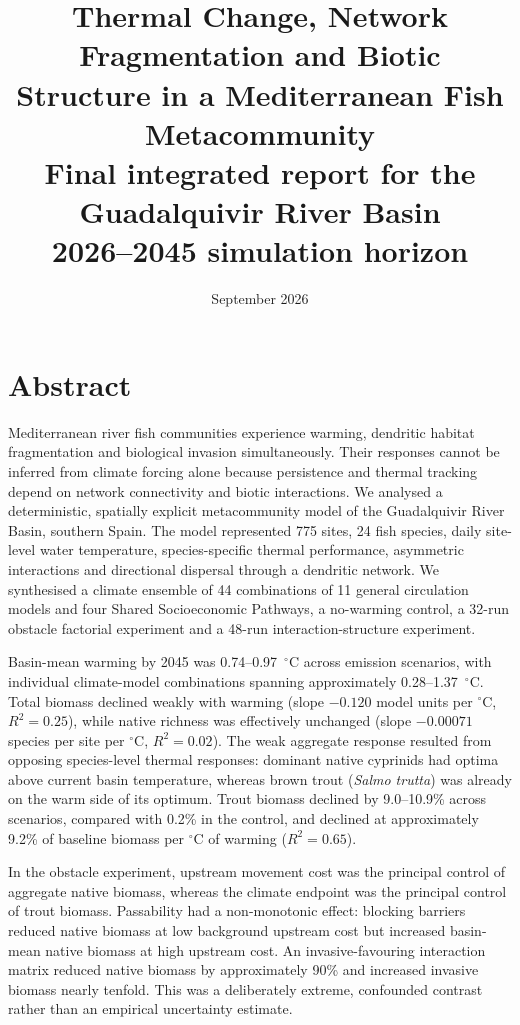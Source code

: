 \documentclass[11pt,a4paper]{article}
\title{\textbf{Thermal Change, Network Fragmentation and Biotic Structure in a Mediterranean Fish Metacommunity}\\
\vspace{0.15in}
Final integrated report for the Guadalquivir River Basin\\
2026--2045 simulation horizon}
\author{}
\date{September 2026}
\begin{document}
\maketitle
\tableofcontents
\newpage

\section{Abstract}

Mediterranean river fish communities experience warming, dendritic habitat fragmentation and biological invasion simultaneously. Their responses cannot be inferred from climate forcing alone because persistence and thermal tracking depend on network connectivity and biotic interactions. We analysed a deterministic, spatially explicit metacommunity model of the Guadalquivir River Basin, southern Spain. The model represented 775 sites, 24 fish species, daily site-level water temperature, species-specific thermal performance, asymmetric interactions and directional dispersal through a dendritic network. We synthesised a climate ensemble of 44 combinations of 11 general circulation models and four Shared Socioeconomic Pathways, a no-warming control, a 32-run obstacle factorial experiment and a 48-run interaction-structure experiment.

Basin-mean warming by 2045 was 0.74--0.97~$^\circ$C across emission scenarios, with individual climate-model combinations spanning approximately 0.28--1.37~$^\circ$C. Total biomass declined weakly with warming (slope $-0.120$ model units per $^\circ$C, $R^2=0.25$), while native richness was effectively unchanged (slope $-0.00071$ species per site per $^\circ$C, $R^2=0.02$). The weak aggregate response resulted from opposing species-level thermal responses: dominant native cyprinids had optima above current basin temperature, whereas brown trout (\textit{Salmo trutta}) was already on the warm side of its optimum. Trout biomass declined by 9.0--10.9\% across scenarios, compared with 0.2\% in the control, and declined at approximately 9.2\% of baseline biomass per $^\circ$C of warming ($R^2=0.65$).

In the obstacle experiment, upstream movement cost was the principal control of aggregate native biomass, whereas the climate endpoint was the principal control of trout biomass. Passability had a non-monotonic effect: blocking barriers reduced native biomass at low background upstream cost but increased basin-mean native biomass at high upstream cost. An invasive-favouring interaction matrix reduced native biomass by approximately 90\% and increased invasive biomass nearly tenfold. This was a deliberately extreme, confounded contrast rather than an empirical uncertainty estimate.
\end{document}
